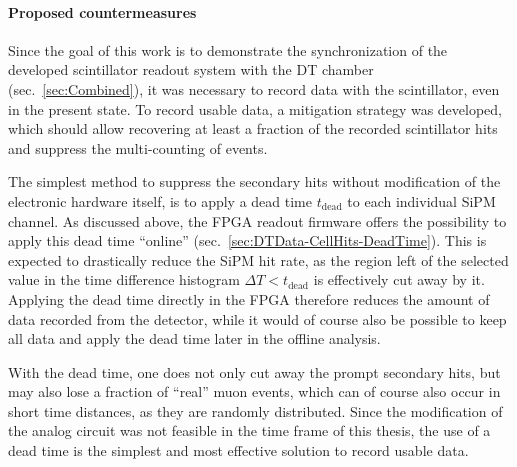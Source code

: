 \paragraph{Proposed countermeasures}
Since the goal of this work is to demonstrate the synchronization of the developed scintillator readout system with the \ac{DT} chamber (sec.\ \ref{sec:Combined}), it was necessary to record data with the scintillator, even in the present state. To record usable data, a mitigation strategy was developed, which should allow recovering at least a fraction of the recorded scintillator hits and suppress the multi-counting of events.
\par The simplest method to suppress the secondary hits without modification of the electronic hardware itself, is to apply a dead time $t_\text{dead}$ to each individual \ac{SiPM} channel. As discussed above, the \ac{FPGA} readout firmware offers the possibility to apply this dead time \enquote{online} (sec.\ \ref{sec:DTData-CellHits-DeadTime}). This is expected to drastically reduce the \ac{SiPM} hit rate, as the region left of the selected value in the time difference histogram $\Delta T < t_\text{dead}$ is effectively cut away by it. Applying the dead time directly in the \ac{FPGA} therefore reduces the amount of data recorded from the detector, while it would of course also be possible to keep all data and apply the dead time later in the offline analysis.
\par With the dead time, one does not only cut away the prompt secondary hits, but may also lose a fraction of \enquote{real} muon events, which can of course also occur in short time distances, as they are randomly distributed. Since the modification of the analog circuit was not feasible in the time frame of this thesis, the use of a dead time is the simplest and most effective solution to record usable data.

